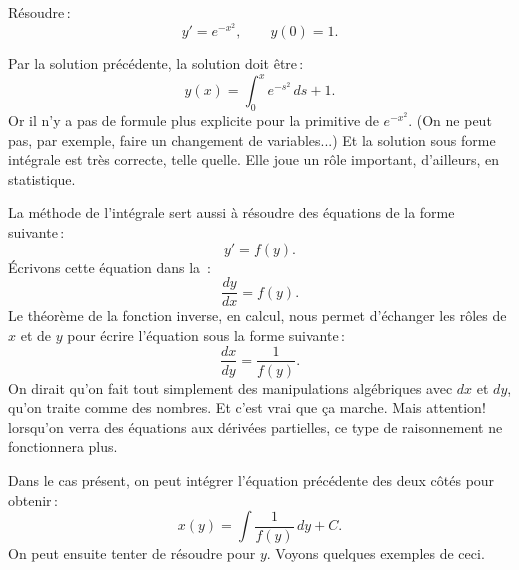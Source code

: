 \begin{example}
Résoudre\,: 
\begin{equation*}
y' = e^{-x^2}, \qquad y(0) = 1 .
\end{equation*}

Par la solution précédente, la solution doit être\,:  
\begin{equation*}
y(x) = \int_0^x e^{-s^2} \,ds + 1 .
\end{equation*}
Or il n'y a pas de formule plus explicite pour la primitive de $e^{-x^2}$.  (On ne peut pas, par exemple, faire un changement de variables...)  Et la solution sous forme intégrale est très correcte, telle quelle.  Elle joue un rôle important, d'ailleurs, en statistique.
\end{example}

La méthode de l'intégrale sert aussi à résoudre des équations de la forme suivante\,: 
\begin{equation*}
y' = f(y) .
\end{equation*}
Écrivons cette équation dans la \,: 
\begin{equation*}
\frac{dy}{dx} = f(y) .
\end{equation*}
Le théorème de la fonction inverse, en calcul, nous permet d'échanger les rôles de $x$ et de $y$ pour écrire l'équation sous la forme suivante\,: 
\begin{equation*}
\frac{dx}{dy} = \frac{1}{f(y)} .
\end{equation*}
On dirait qu'on fait tout simplement des manipulations algébriques avec $dx$ et $dy$, qu'on traite comme des nombres.  Et c'est vrai que ça marche.  Mais attention! lorsqu'on verra des équations aux dérivées partielles, ce type de raisonnement ne fonctionnera plus.

Dans le cas présent, on peut intégrer l'équation précédente des deux côtés pour obtenir\,: 
\begin{equation*}
x(y) = \int \frac{1}{f(y)} \,dy + C .
\end{equation*}
On peut ensuite tenter de résoudre pour $y$.  Voyons quelques exemples de ceci.

